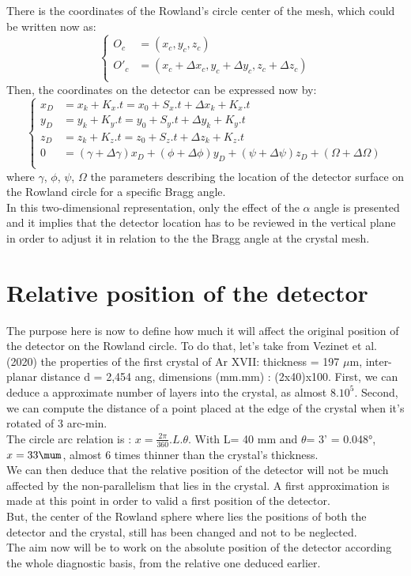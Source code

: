 \documentclass[a4paper,11pt,twoside,openright]{article}
\newcommand{\lt}{\left}
\newcommand{\rt}{\right}
\begin{document}
There is the coordinates of the Rowland's circle center of the mesh, which could be written now as:
$$
\lt\{
	\begin{array}{ll}
		O_{c} & = (x_{c}, y_{c}, z_{c}) \\
		O'_{c} & = (x_{c}+\Delta  x_{c}, y_{c}+\Delta  y_{c}, z_{c}+\Delta  z_{c}) \\
	\end{array}
\rt.
$$
Then, the coordinates on the detector can be expressed now by:
$$
\lt\{
	\begin{array}{ll}
		x_{D} & = x_{k} + K_{x}.t = x_{0} + S_{x}.t + \Delta x_{k} + K_{x}.t \\
		y_{D} & = y_{k} + K_{y}.t = y_{0} + S_{y}.t + \Delta y_{k} + K_{y}.t \\
		z_{D} & = z_{k} + K_{z}.t = z_{0} + S_{z}.t + \Delta z_{k} + K_{z}.t \\
		0 & = (\gamma +\Delta \gamma)x_{D} + (\phi +\Delta \phi)y_{D} + (\psi +\Delta \psi)z_{D} + (\Omega +\Delta \Omega)\\
	\end{array}
\rt.
$$
where $\gamma$, $\phi$, $\psi$, $\Omega$ the parameters describing the location of the detector surface on the Rowland circle for a specific Bragg angle. \\
In this two-dimensional representation, only the effect of the $\alpha$ angle is presented and it implies that the detector location has to be reviewed in the vertical plane in order to adjust it in relation to the the Bragg angle at the crystal mesh.\\

\section{Relative position of the detector}
The purpose here is now to define how much it will affect the original position of the detector on the Rowland circle. 
To do that, let's take from Vezinet et al. (2020) the properties of the first crystal of Ar XVII: thickness = 197 $\mu$m, inter-planar distance d = 2,454 ang, dimensions (mm.mm) : (2x40)x100.
First, we can deduce a approximate number of layers into the crystal, as almost $8.10^{5}$. Second, we can compute the distance of a point placed at the edge of the crystal when it's rotated of 3 arc-min.\\
The circle arc relation is : $x = \frac{2\pi}{360}.L.\theta$. With L= 40 mm and $\theta$= 3' = 0.048°, $x = 33 \mum$, almost 6 times thinner than the crystal's thickness. \\
We can then deduce that the relative position of the detector will not be much affected by the non-parallelism that lies in the crystal. A first approximation is made at this point in order to valid a first position of the detector.\\
But, the center of the Rowland sphere where lies the positions of both the detector and the crystal, still has been changed and not to be neglected. \\
The aim now will be to work on the absolute position of the detector according the whole diagnostic basis, from the relative one deduced earlier.
\end{document}

